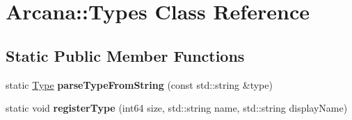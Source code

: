 \hypertarget{class_arcana_1_1_types}{}\section{Arcana\+:\+:Types Class Reference}
\label{class_arcana_1_1_types}
\subsection*{Static Public Member Functions}
\begin{DoxyCompactItemize}
\item 
\mbox{\label{class_arcana_1_1_types_a0939fc459ad6a4e9f45908c2b261b3eb}} 
static \mbox{\hyperlink{class_arcana_1_1_type}{Type}} {\bfseries parse\+Type\+From\+String} (const std\+::string \&type)
\item 
\mbox{\label{class_arcana_1_1_types_a4531ff815c987672c6bc83363a247b74}} 
static void {\bfseries register\+Type} (int64 size, std\+::string name, std\+::string display\+Name)
\end{DoxyCompactItemize}
